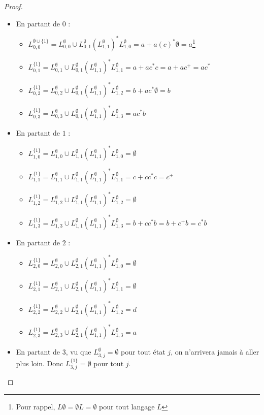 \begin{proof}
\begin{itemize}
\item En partant de $0$ :
   \begin{itemize}
	 \item $L_{0,0}^{\emptyset \cup \{1\}} = L_{0,0}^{\emptyset} \cup L_{0,1}^{\emptyset}(L_{1,1}^{\emptyset})^*L_{1,0}^{\emptyset} = a + a(c)^*\emptyset = a$\footnote{Pour rappel, $L\emptyset = \emptyset L = \emptyset$ pour tout langage $L$}
	 \item $L_{0,1}^{\{1\}} = L_{0,1}^{\emptyset} \cup L_{0,1}^{\emptyset}(L_{1,1}^{\emptyset})^*L_{1,1}^{\emptyset} = a + ac^*c = a + ac^+ = ac^*$
	 \item $L_{0,2}^{\{1\}} = L_{0,2}^{\emptyset} \cup L_{0,1}^{\emptyset}(L_{1,1}^{\emptyset})^*L_{1,2}^{\emptyset} = b + ac^*\emptyset = b$
	 \item $L_{0,3}^{\{1\}} = L_{0,3}^{\emptyset} \cup L_{0,1}^{\emptyset}(L_{1,1}^{\emptyset})^*L_{1,3}^{\emptyset} = ac^*b$
   \end{itemize}
\item En partant de $1$ :
   \begin{itemize}
	 \item $L_{1,0}^{\{1\}} = L_{1,0}^{\emptyset} \cup L_{1,1}^{\emptyset}(L_{1,1}^{\emptyset})^*L_{1,0}^{\emptyset} = \emptyset$
	 \item $L_{1,1}^{\{1\}} = L_{1,1}^{\emptyset} \cup L_{1,1}^{\emptyset}(L_{1,1}^{\emptyset})^*L_{1,1}^{\emptyset} = c + cc^*c = c^+$
	 \item $L_{1,2}^{\{1\}} = L_{1,2}^{\emptyset} \cup L_{1,1}^{\emptyset}(L_{1,1}^{\emptyset})^*L_{1,2}^{\emptyset} = \emptyset$
	 \item $L_{1,3}^{\{1\}} = L_{1,3}^{\emptyset} \cup L_{1,1}^{\emptyset}(L_{1,1}^{\emptyset})^*L_{1,3}^{\emptyset} = b + cc^*b = b + c^+b = c^*b$
   \end{itemize}
\item En partant de $2$ :
   \begin{itemize}
	 \item $L_{2,0}^{\{1\}} = L_{2,0}^{\emptyset} \cup L_{2,1}^{\emptyset}(L_{1,1}^{\emptyset})^*L_{1,0}^{\emptyset} = \emptyset$
	 \item $L_{2,1}^{\{1\}} = L_{2,1}^{\emptyset} \cup L_{2,1}^{\emptyset}(L_{1,1}^{\emptyset})^*L_{1,1}^{\emptyset} = \emptyset$
	 \item $L_{2,2}^{\{1\}} = L_{2,2}^{\emptyset} \cup L_{2,1}^{\emptyset}(L_{1,1}^{\emptyset})^*L_{1,2}^{\emptyset} = d$
	 \item $L_{2,3}^{\{1\}} = L_{2,3}^{\emptyset} \cup L_{2,1}^{\emptyset}(L_{1,1}^{\emptyset})^*L_{1,3}^{\emptyset} = a$
   \end{itemize}
\item En partant de $3$, vu que $L_{3,j}^{\emptyset} = \emptyset$ pour tout état $j$, on n'arrivera jamais à aller plus loin. Donc $L_{3,j}^{\{1\}} = \emptyset$ pour tout $j$.
\end{itemize}


\end{proof}
